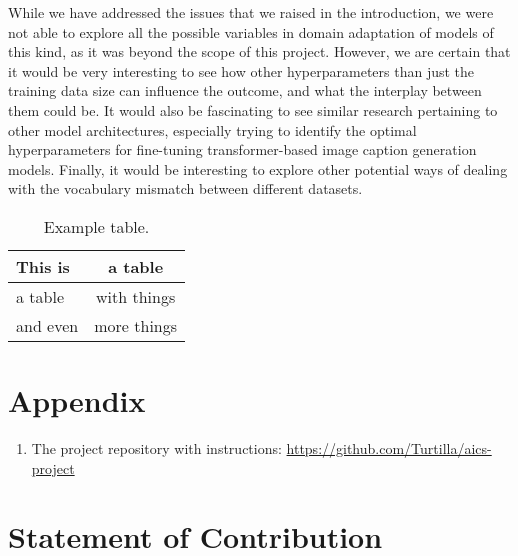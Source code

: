 \documentclass[11pt]{article}
\begin{document}
While we have addressed the issues that we raised in the introduction, we were not able to explore all the possible variables in domain adaptation of models of this kind, as it was beyond the scope of this project. However, we are certain that it would be very interesting to see how other hyperparameters than just the training data size can influence the outcome, and what the interplay between them could be. It would also be fascinating to see similar research pertaining to other model architectures, especially trying to identify the optimal hyperparameters for fine-tuning transformer-based image caption generation models. Finally, it would be interesting to explore other potential ways of dealing with the vocabulary mismatch between different datasets.

\begin{table}
\centering
\begin{tabular}{lc}
\hline
\textbf{This is} & \textbf{a table}\\
\hline
a table & with things \\
and even & more things  \\\hline
\end{tabular}
\caption{Example table.}
\label{tab:accents}
\end{table}



\appendix

\section{Appendix}
\label{sec:appendix}

\begin{enumerate}
    \item The project repository with instructions: \url{https://github.com/Turtilla/aics-project}
\end{enumerate}

\section{Statement of Contribution}
\label{sec:contribution}
\end{document}
